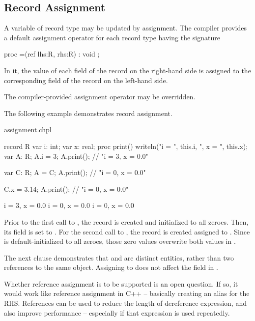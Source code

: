 \subsection{Record Assignment}
\label{Record_Assignment}

A variable of record type may be updated by assignment.  The compiler provides
a default assignment operator for each record type  having the signature
\begin{example}
\begin{chapel}
proc =(ref lhs:R, rhs:R) : void ;
\end{chapel}
\end{example}
\noindent
In it, the value of each field of the record on the right-hand side is assigned
to the corresponding field of the record on the left-hand side.

The compiler-provided assignment operator may be overridden.

The following example demonstrates record assignment.
\begin{chapelexample}{assignment.chpl}
\begin{chapel}
record R {
  var i: int;
  var x: real;
  proc print() { writeln("i = ", this.i, ", x = ", this.x); }
}
var A: R;
A.i = 3;
A.print();	// "i = 3, x = 0.0"

var C: R;
A = C;
A.print();	// "i = 0, x = 0.0"

C.x = 3.14;
A.print();	// "i = 0, x = 0.0"
\end{chapel}
\begin{chapeloutput}
i = 3, x = 0.0
i = 0, x = 0.0
i = 0, x = 0.0
\end{chapeloutput}
Prior to the first call to , the record  is created and
initialized to all zeroes.  Then, its  field is set to .
For the second call to , the record  is created assigned
to .  Since  is default-initialized to all zeroes, those zero
values overwrite both values in .

The next clause demonstrates that  and  are distinct entities,
rather than two references to the same object.  Assigning 
to  does not affect the  field in .
\end{chapelexample}

\begin{openissue}
Whether reference assignment is to be supported is an open question.
If so, it would work like reference assignment in C++ -- basically creating an
alias for the RHS.
References can be used to reduce the length of dereference expression, and also
improve performance -- especially if that expression is used repeatedly.
\end{openissue}

